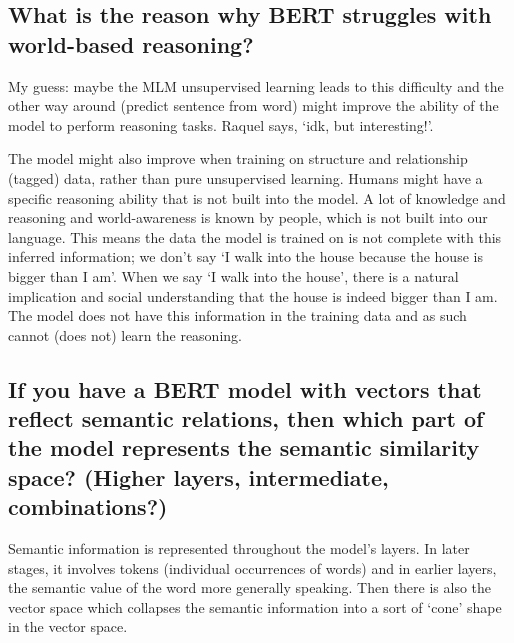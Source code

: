 \documentclass[
  11pt,
  british,
]{article}
\begin{document}
\hypertarget{what-is-the-reason-why-bert-struggles-with-world-based-reasoning}{%
\subsection{What is the reason why BERT struggles with world-based
reasoning?}\label{what-is-the-reason-why-bert-struggles-with-world-based-reasoning}}

My guess: maybe the MLM unsupervised learning leads to this difficulty
and the other way around (predict sentence from word) might improve the
ability of the model to perform reasoning tasks. Raquel says, `idk, but
interesting!'.

The model might also improve when training on structure and relationship
(tagged) data, rather than pure unsupervised learning. Humans might have
a specific reasoning ability that is not built into the model. A lot of
knowledge and reasoning and world-awareness is known by people, which is
not built into our language. This means the data the model is trained on
is not complete with this inferred information; we don't say `I walk
into the house because the house is bigger than I am'. When we say `I
walk into the house', there is a natural implication and social
understanding that the house is indeed bigger than I am. The model does
not have this information in the training data and as such cannot (does
not) learn the reasoning.

\hypertarget{if-you-have-a-bert-model-with-vectors-that-reflect-semantic-relations-then-which-part-of-the-model-represents-the-semantic-similarity-space-higher-layers-intermediate-combinations}{%
\subsection{If you have a BERT model with vectors that reflect semantic
relations, then which part of the model represents the semantic
similarity space? (Higher layers, intermediate,
combinations?)}\label{if-you-have-a-bert-model-with-vectors-that-reflect-semantic-relations-then-which-part-of-the-model-represents-the-semantic-similarity-space-higher-layers-intermediate-combinations}}

Semantic information is represented throughout the model's layers. In
later stages, it involves tokens (individual occurrences of words) and
in earlier layers, the semantic value of the word more generally
speaking. Then there is also the vector space which collapses the
semantic information into a sort of `cone' shape in the vector space.
\end{document}

